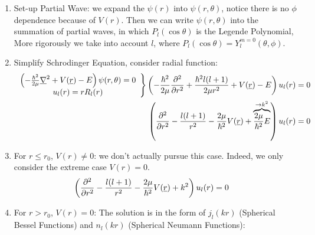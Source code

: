 \documentclass{school-22.101-notes}
\begin{document}
\begin{enumerate}
\item Set-up Partial Wave: we expand the $\psi(r)$ into $\psi(r, \theta)$, notice there is no $\phi$ dependence because of $V(r)$. Then we can write $\psi(r,\theta)$ into the summation of partial waves, in which $P_l (\cos \theta)$ is the Legende Polynomial, 
More rigorously we take into account $l$, 
where $P_l (\cos \theta) = Y_l^{m=0} (\theta, \phi)$. 

\item Simplify Schrodinger Equation, consider radial function: 
\begin{align}
\left. \begin{array}{c}
\left(- \frac{\hbar^2}{2 \mu} \underline{\nabla}^2 + V(\underline{r}) - E  \right) \psi(r,\theta) = 0 \\
u_l (r) = r R_l (r) 
\end{array} \right\} 
\left( -\frac{\hbar^2}{2 \mu} \frac{\partial^{2} }{\partial r ^{2}} +\frac{\hbar^2 l(l+1)}{2 \mu r^2} + V(\underline{r}) - E  \right) u_l (r) &= 0 \\
\left( \frac{\partial^{2} }{\partial r ^{2}} - \frac{l(l+1)}{r^2} - \frac{2\mu}{\hbar^2} V(\underline{r}) + \overbrace{\frac{2\mu}{\hbar^2} E}^{\to k^2}  \right) u_l (r) &= 0 
\end{align}

\item For $r\le r_0$, $V(r) \neq 0$: we don't actually pursue this case. Indeed, we only consider the extreme case $V (r) =0$. 
\begin{align}
\left( \frac{\partial^{2} }{\partial r ^{2}} - \frac{l(l+1)}{r^2} - \frac{2\mu}{\hbar^2} V(\underline{r}) + k^2  \right) u_l (r) &= 0 
\end{align}

\item For $r>r_0$, $V(r) =0$: 
The solution is in the form of $j_l (kr)$ (Spherical Bessel Functions) and $n_l (kr)$ (Spherical Neumann Functions):


\end{enumerate}
\end{document}
